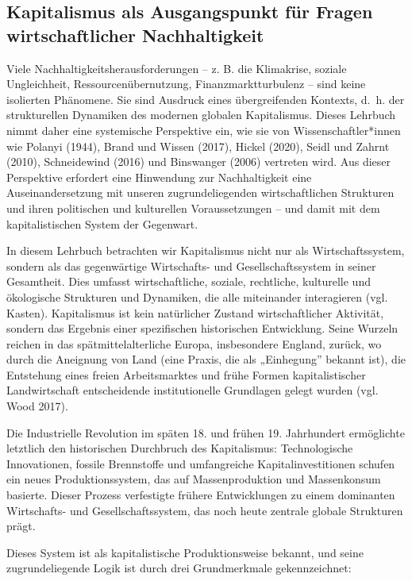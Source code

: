 \documentclass[
  nswissgerman,
  a4paper,
  openany]{book}
\begin{document}
\subsection{Kapitalismus als Ausgangspunkt für Fragen wirtschaftlicher
Nachhaltigkeit}\label{kapitalismus-als-ausgangspunkt-fuxfcr-fragen-wirtschaftlicher-nachhaltigkeit}

Viele Nachhaltigkeitsherausforderungen -- z. B. die Klimakrise, soziale
Ungleichheit, Ressourcenübernutzung, Finanzmarktturbulenz -- sind keine
isolierten Phänomene. Sie sind Ausdruck eines übergreifenden Kontexts,
d.~h. der strukturellen Dynamiken des modernen globalen Kapitalismus.
Dieses Lehrbuch nimmt daher eine systemische Perspektive ein, wie sie
von Wissenschaftler*innen wie Polanyi (1944), Brand und Wissen (2017),
Hickel (2020), Seidl und Zahrnt (2010), Schneidewind (2016) und
Binswanger (2006) vertreten wird. Aus dieser Perspektive erfordert eine
Hinwendung zur Nachhaltigkeit eine Auseinandersetzung mit unseren
zugrundeliegenden wirtschaftlichen Strukturen und ihren politischen und
kulturellen Voraussetzungen -- und damit mit dem kapitalistischen System
der Gegenwart.

In diesem Lehrbuch betrachten wir Kapitalismus nicht nur als
Wirtschaftssystem, sondern als das gegenwärtige Wirtschafts- und
Gesellschaftssystem in seiner Gesamtheit. Dies umfasst wirtschaftliche,
soziale, rechtliche, kulturelle und ökologische Strukturen und
Dynamiken, die alle miteinander interagieren (vgl. Kasten). Kapitalismus
ist kein natürlicher Zustand wirtschaftlicher Aktivität, sondern das
Ergebnis einer spezifischen historischen Entwicklung. Seine Wurzeln
reichen in das spätmittelalterliche Europa, insbesondere England,
zurück, wo durch die Aneignung von Land (eine Praxis, die als
„Einhegung'' bekannt ist), die Entstehung eines freien Arbeitsmarktes
und frühe Formen kapitalistischer Landwirtschaft entscheidende
institutionelle Grundlagen gelegt wurden (vgl. Wood 2017).

Die Industrielle Revolution im späten 18. und frühen 19. Jahrhundert
ermöglichte letztlich den historischen Durchbruch des Kapitalismus:
Technologische Innovationen, fossile Brennstoffe und umfangreiche
Kapitalinvestitionen schufen ein neues Produktionssystem, das auf
Massenproduktion und Massenkonsum basierte. Dieser Prozess verfestigte
frühere Entwicklungen zu einem dominanten Wirtschafts- und
Gesellschaftssystem, das noch heute zentrale globale Strukturen prägt.

Dieses System ist als kapitalistische Produktionsweise bekannt, und
seine zugrundeliegende Logik ist durch drei Grundmerkmale
gekennzeichnet:
\end{document}
